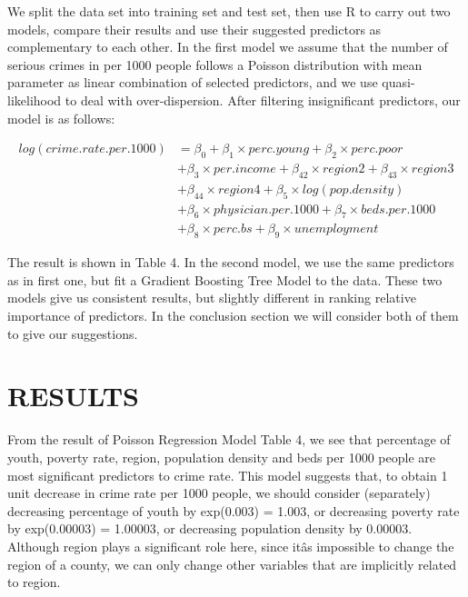 \documentclass[preprint,12pt,3p]{elsarticle}
\begin{document}
\indent
We split the data set into training set and test set, then use R to carry out two models, compare their results and use their suggested predictors as complementary to each other.
In the first model we assume that the number of serious crimes in per 1000 people follows a Poisson distribution with mean parameter as linear combination of selected predictors, and we use quasi-likelihood to deal with over-dispersion. After filtering insignificant predictors, our model is as follows:

\begin{align}
log(crime.rate.per.1000) &= \beta_{0} + \beta_{1}\times perc.young + \beta_{2}\times perc.poor\nonumber\\
                         & +\beta_{3}\times per.income + \beta_{42}\times region2 + \beta_{43}\times region3 \nonumber\\
  &+ \beta_{44}\times region4 +\beta_{5}\times log(pop.density) \nonumber\\
  &+ \beta_{6}\times physician.per.1000 + \beta_{7}\times beds.per.1000 \nonumber\\
  &+ \beta_{8}\times perc.bs + \beta_{9}\times unemployment\nonumber
\end{align}


The result is shown in Table 4.
In the second model, we use the same predictors as in first one, but fit a Gradient Boosting Tree Model to the data.
These two models give us consistent results, but slightly different in ranking relative importance of predictors. In the conclusion section we will consider both of them to give our suggestions.



\section{RESULTS}
\label{sec3}

From the result of Poisson Regression Model Table 4, we see that percentage of youth, poverty rate, region, population density and beds per 1000 people are most significant predictors to crime rate. This model suggests that, to obtain 1 unit decrease in crime rate per 1000 people, we should consider (separately) decreasing percentage of youth by exp(0.003) = 1.003, or decreasing poverty rate by exp(0.00003) = 1.00003, or decreasing population density by 0.00003.
Although region plays a significant role here, since itâs impossible to change the region of a county, we can only change other variables that are implicitly related to region.
\end{document}
